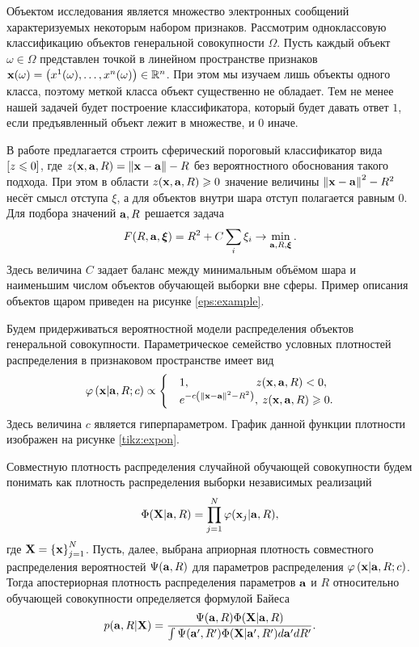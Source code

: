 Объектом исследования является множество электронных сообщений характеризуемых некоторым набором признаков.
Рассмотрим одноклассовую классификацию объектов генеральной совокупности $\Omega$.
Пусть каждый объект $\omega \in{\Omega}$  представлен точкой в линейном пространстве признаков
$\boldsymbol{\mathbf{x}}(\omega)=\left(x^1(\omega),\ldots, x^n(\omega)\right) \in {\mathbb R^n}$. При этом мы изучаем лишь объекты одного класса, поэтому меткой класса объект существенно не обладает. 
Тем не менее нашей задачей будет построение классификатора, который будет давать ответ $1$, если предъявленный объект лежит в множестве, и $0$ иначе.

В работе \cite{Tax2001}  предлагается строить сферический пороговый классификатор вида 
$\left[z \leqslant 0\right] $, где $z(\boldsymbol{\mathbf{x}},\boldsymbol{\mathbf{a}},R)=\left\|{\boldsymbol{\mathbf{x}}-\boldsymbol{\mathbf{a}}}\right\|-R$ без вероятностного обоснования такого подхода. При этом в области $z(\boldsymbol{\mathbf{x}}, \boldsymbol{\mathbf{a}}, R) \geqslant 0$ значение величины $\left\|{\boldsymbol{\mathbf{x}}-\boldsymbol{\mathbf{a}}}\right\|^2-R^2$ несёт смысл отступа $\xi$, а для объектов внутри шара отступ полагается равным 0. Для подбора значений $\boldsymbol{\mathbf{a}}, R$ решается задача
\begin{equation}
	\label{min:noprob}
	F(R,\boldsymbol{\mathbf{a}}, \boldsymbol{\mathbf{\xi}}) = R^2 + C\sum_i\xi_i \to \min_{\boldsymbol{\mathbf{a}}, R, \boldsymbol{\mathbf{\xi}}}.
\end{equation}
Здесь величина $C$ задает баланс между минимальным объёмом шара и наименьшим числом объектов обучающей выборки вне сферы. Пример описания объектов щаром приведен на рисунке \ref{eps:example}.


Будем придерживаться вероятностной модели распределения объектов генеральной совокупности.
Параметрическое семейство условных плотностей распределения в признаковом пространстве имеет вид 
\begin{equation}
	\label{PhiXARC}
	\varphi \left( {\boldsymbol{\mathbf{x}} | \boldsymbol{\mathbf{a}},R;c} \right) \propto
		\begin{cases}
			&1, 		\qquad\qquad\qquad  	\! 	z(\boldsymbol{\mathbf{x}},\boldsymbol{\mathbf{a}},R) < 0, \\
			&e^{-c \left(\left\|{\boldsymbol{\mathbf{x}}-\boldsymbol{\mathbf{a}}}\right\|^2-R^2\right)}, 	\:	z(\boldsymbol{\mathbf{x}},\boldsymbol{\mathbf{a}},R) \geqslant 0.
		\end{cases} 
\end{equation}
Здесь величина $c$ является гиперпараметром. График данной функции плотности изображен на рисунке \ref{tikz:expon}.


Совместную плотность распределения случайной обучающей совокупности будем понимать как плотность распределения выборки независимых реализаций
$$\Phi(\boldsymbol{\mathbf{X}}|\boldsymbol{\mathbf{a}},R)=\prod_{j=1}^N \varphi(\boldsymbol{\mathbf{x}}_j|\boldsymbol{\mathbf{a}},R),$$ 
где $\boldsymbol{\mathbf{X}}=\left\{\boldsymbol{\mathbf{x}}\right\}_{j=1}^N$.
Пусть, далее, выбрана априорная плотность совместного распределения вероятностей $\Psi(\boldsymbol{\mathbf{a}},R)$ для параметров распределения $\varphi \left(\boldsymbol{\mathbf{x}} | \boldsymbol{\mathbf{a}},R;c\right)$. 
Тогда апостериорная плотность распределения параметров $\boldsymbol{\mathbf{a}}$ и $R$ относительно обучающей совокупности определяется формулой Байеса
\begin{equation}
	\label{Prob:aRX}
	p(\boldsymbol{\mathbf{a}},R|\boldsymbol{\mathbf{X}})
	= \frac {\Psi(\boldsymbol{\mathbf{a}},R) \Phi(\boldsymbol{\mathbf{X}}|\boldsymbol{\mathbf{a}},R)}
			{\int {\Psi(\ensuremath{\boldsymbol{\mathbf{a}}}',R') \Phi(\ensuremath{\boldsymbol{\mathbf{X}}}|\ensuremath{\boldsymbol{\mathbf{a}}}',R')d\ensuremath{\boldsymbol{\mathbf{a}}}'dR'}}.
\end{equation}

